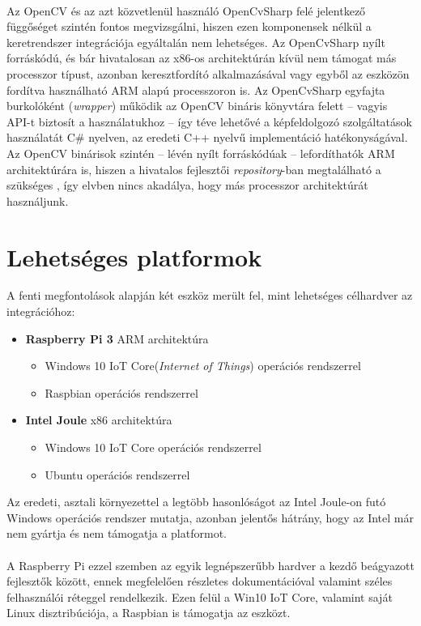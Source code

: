 \\
Az OpenCV és az azt közvetlenül használó OpenCvSharp felé jelentkező függőséget szintén fontos megvizsgálni, hiszen ezen komponensek nélkül a keretrendszer integrációja egyáltalán nem lehetséges. Az OpenCvSharp nyílt forráskódú, és bár hivatalosan az x86-os architektúrán kívül nem támogat más processzor típust, azonban keresztfordító alkalmazásával vagy egyből az eszközön fordítva használható ARM alapú processzoron is. Az OpenCvSharp egyfajta burkolóként (\emph{wrapper}) működik az OpenCV bináris könyvtára felett -- vagyis API-t biztosít a használatukhoz -- így téve lehetővé a képfeldolgozó szolgáltatások használatát C\# nyelven, az eredeti C++ nyelvű implementáció hatékonyságával. Az OpenCV binárisok szintén -- lévén nyílt forráskódúak -- lefordíthatók ARM architektúrára is, hiszen a hivatalos fejlesztői \textit{repository}-ban megtalálható a szükséges , így elvben nincs akadálya, hogy más processzor architektúrát használjunk. \\

\section{Lehetséges platformok}

A fenti megfontolások alapján két eszköz merült fel, mint lehetséges célhardver az integrációhoz:
\begin{itemize}
\item \textbf{Raspberry Pi 3} ARM architektúra
\begin{itemize}
\item Windows 10 IoT Core(\emph{Internet of Things}) operációs rendszerrel
\item Raspbian operációs rendszerrel
\end{itemize}
\item \textbf{Intel Joule} x86 architektúra
\begin{itemize}
\item Windows 10 IoT Core operációs rendszerrel
\item Ubuntu operációs rendszerrel 
\end{itemize}
\end{itemize}

Az eredeti, asztali környezettel a legtöbb hasonlóságot az Intel Joule-on futó Windows operációs rendszer mutatja, azonban jelentős hátrány, hogy az Intel már nem gyártja és nem támogatja a platformot.\\
\\
A Raspberry Pi ezzel szemben az egyik legnépszerűbb hardver a kezdő beágyazott fejlesztők között, ennek megfelelően részletes dokumentációval valamint széles felhasználói réteggel rendelkezik. Ezen felül a Win10 IoT Core, valamint saját Linux disztribúciója, a Raspbian is támogatja az eszközt.

